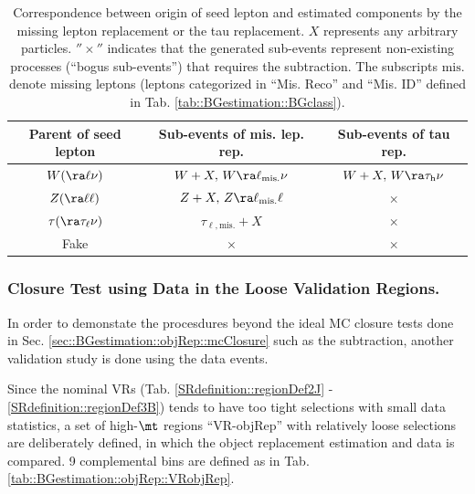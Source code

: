 \begin{table}[h]
  \begin{center}
    \caption{Correspondence between origin of seed lepton and estimated components by the missing lepton replacement or the tau replacement. $X$ represents any arbitrary particles. $''\times''$ indicates that the generated sub-events represent non-existing processes (``bogus sub-events'') that requires the subtraction. The subscripts ${\mathrm{mis.}}$ denote missing leptons (leptons categorized in ``Mis. Reco'' and ``Mis. ID'' defined in Tab. \ref{tab::BGestimation::BGclass}).
}

    \begin{tabular}{  c | c | c  }
      \hline 
      Parent of seed lepton &   Sub-events of mis. lep. rep.  &  Sub-events of tau rep.  \\
%
      \hline 
      \hline      
      $W (\ra\ell\nu)$ &       $W+X, \, W\ra \ell_{\mathrm{mis.}}\nu$       &      $W+X, \, W\ra\tau_{\mathrm{h}} \nu$ \\
      \hline
      $Z (\ra\ell\ell)$ &       $Z+X, \, Z\ra \ell_{\mathrm{mis.}}\ell$     &      $\times$ \\
      \hline
      $\tau (\ra \tau_\ell \nu)$ &              $\tau_{\ell,{\mathrm{mis.}}}+X$             &      $\times$ \\
      \hline
      Fake &       $\times$       &      $\times$ \\
      \hline
    \end{tabular}  \label{tab::BGestimation::objRep::relProc}
  \end{center}
\end{table}




\clearpage
\subsubsection{Closure Test using Data in the Loose Validation Regions.} \label{sec::BGestimation::objRep::dataClosure}
In order to demonstate the procesdures beyond the ideal MC closure tests done in Sec. \ref{sec::BGestimation::objRep::mcClosure} such as the subtraction,
another validation study is done using the data events.

Since the nominal VRs (Tab. \ref{SRdefinition::regionDef2J} - \ref{SRdefinition::regionDef3B}) tends to have too tight selections with small data statistics, a set of high-$\mt$ regions ``VR-objRep'' with relatively loose selections are deliberately defined, in which the object replacement estimation and data is compared. 9 complemental bins are defined as in Tab. \ref{tab::BGestimation::objRep::VRobjRep}. \\

